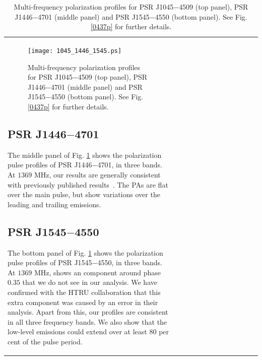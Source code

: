 \documentclass[useAMS,usenatbib]{mn2e}
\begin{document}
\begin{table}
\begin{center}
\begin{tabular}{lcccccccccccc}

\begin{figure}
\begin{center}
\texttt{[image: 1045\_1446\_1545.ps]}
\caption{Multi-frequency polarization profiles for PSR J1045$-$4509 (top 
panel), PSR J1446$-$4701 (middle panel) and PSR J1545$-$4550 (bottom panel). 
See Fig. \ref{0437p} for further details.}
\label{1045p}
\end{center}
\end{figure}

\subsection{PSR J1446$-$4701}

The middle panel of Fig. \ref{1045p} shows the polarization pulse profiles of 
PSR J1446$-$4701, in three bands.
%
At $1369$ MHz, our results are generally consistent with previously published
results~\citep{Keith12}.
%
The PAs are flat over the main pulse, but show variations over the leading and 
trailing emissions.
%

\subsection{PSR J1545$-$4550}

The bottom panel of Fig. \ref{1045p} shows the polarization pulse profiles of 
PSR J1545$-$4550, in three bands.
%
At $1369$ MHz, \citet{Burgay13} shows an component around phase $0.35$ that 
we do not see in our analysis. We have confirmed with the HTRU collaboration 
that this extra component was caused by an error in their analysis.  
%
Apart from this, our profiles are consistent in all three frequency bands.
%
We also show that the low-level emissions could extend over at least $80$ 
per cent of the pulse period.


\end{tabular}
\end{center}
\end{table}
\end{document}
